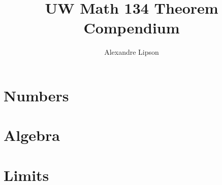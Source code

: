 \documentclass{article}
\title{UW Math 134 Theorem Compendium}
\author{Alexandre Lipson}
\begin{document}
\maketitle

\section*{Numbers}


\section*{Algebra}


\section*{Limits}

\end{document}

